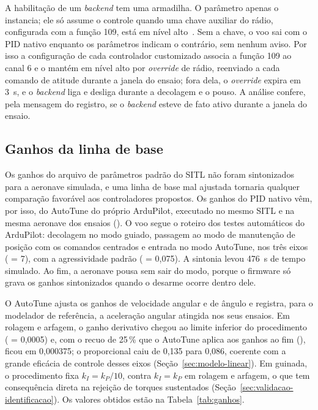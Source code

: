 A habilitação de um \textit{backend} tem uma armadilha. O parâmetro
 apenas o instancia; ele só assume o controle quando uma
chave auxiliar do rádio, configurada com a função 109, está em nível
alto~\cite{ardupilot2026}. Sem a chave, o voo sai com o PID nativo enquanto os
parâmetros indicam o contrário, sem nenhum aviso. Por isso a configuração de
cada controlador customizado associa a função 109 ao canal 6 e o mantém em
nível alto por \textit{override} de rádio, reenviado a cada comando de
atitude durante a janela do ensaio; fora dela, o \textit{override} expira em
\SI{3}{\second}, e o \textit{backend} liga e desliga durante a decolagem e o
pouso. A análise confere, pela mensagem  do registro, se o
\textit{backend} esteve de fato ativo durante a janela do ensaio.

\subsection{Ganhos da linha de base}
\label{sec:autotune}

Os ganhos do arquivo de parâmetros padrão do SITL não foram sintonizados para
a aeronave simulada, e uma linha de base mal ajustada tornaria qualquer
comparação favorável aos controladores propostos. Os ganhos do PID nativo
vêm, por isso, do AutoTune do próprio ArduPilot, executado no mesmo SITL e na
mesma aeronave dos ensaios (). O voo segue o
roteiro dos testes automáticos do ArduPilot: decolagem no modo guiado,
passagem ao modo de manutenção de posição com os comandos centrados e entrada
no modo AutoTune, nos três eixos ( = 7), com a
agressividade padrão ( = 0,075). A sintonia levou
\SI{476}{\second} de tempo simulado. Ao fim, a aeronave pousa sem sair do
modo, porque o firmware só grava os ganhos sintonizados quando o desarme
ocorre dentro dele.

O AutoTune ajusta os ganhos de velocidade angular e de ângulo e registra, para
o modelador de referência, a aceleração angular atingida nos seus ensaios. Em
rolagem e arfagem, o ganho derivativo chegou ao limite inferior do
procedimento ( = 0,0005) e, com o recuo de 25\,\%
que o AutoTune aplica aos ganhos ao fim (), ficou em
0,000375; o proporcional caiu de 0,135 para 0,086, coerente com a grande
eficácia de controle desses eixos (Seção~\ref{sec:modelo-linear}). Em
guinada, o procedimento fixa $k_I = k_P/10$, contra $k_I = k_P$ em rolagem e
arfagem, o que tem consequência direta na rejeição de torques sustentados
(Seção~\ref{sec:validacao-identificacao}). Os valores obtidos estão na
Tabela~\ref{tab:ganhos}.

